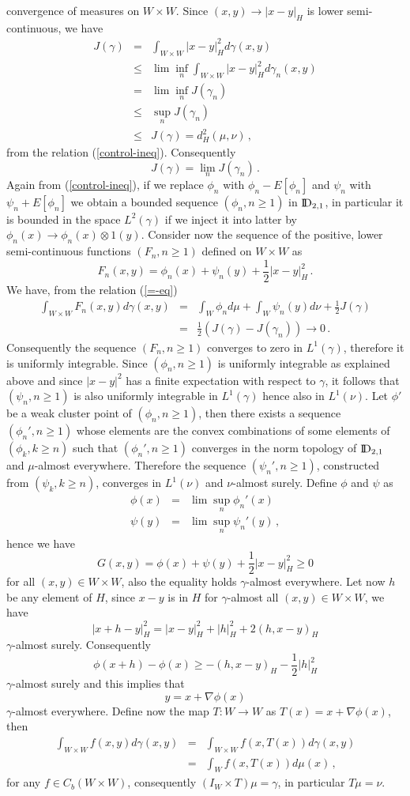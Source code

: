 \documentclass[12pt,a4paper]{book}
\newcommand{\be}{\begin{equation}}
\newcommand{\ee}{\end{equation}}
\newcommand{\beaa}{\begin{eqnarray*}}
\newcommand{\eeaa}{\end{eqnarray*}}
\newcommand{\DD}{{\rm I\!D}}
\newcommand{\ga}{\gamma}
\begin{document}
convergence of 
measures on $W\times W$. Since $(x,y)\to |x-y|_H$ is lower
semi-continuous, we have 
\beaa
J(\ga)&=&\int_{W\times W}|x-y|_H^2d\ga(x,y)\\
&\leq&\lim\inf_n\int_{W\times W}|x-y|_H^2d\ga_n(x,y)\\
&=&\lim\inf_nJ(\ga_n)\\
&\leq&\sup_nJ(\ga_n)\\
&\leq& J(\ga)=d_H^2(\mu,\nu)\,,
\eeaa
from the relation (\ref{control-ineq}). Consequently 
\be
\label{lim-eq}
J(\ga)=\lim_nJ(\ga_n)\,.
\ee
Again from (\ref{control-ineq}), if we replace $\phi_n$ with $\phi_n-E[\phi_n]$
and $\psi_n$ with $\psi_n+E[\phi_n]$ we obtain a bounded sequence
$(\phi_n,n\geq 1)$ in $\DD_{2,1}$, in particular it is bounded in the
space $L^2(\ga)$ if we inject it into  latter  by $\phi_n(x)\to
\phi_n(x)\otimes 1(y)$. Consider now the sequence of the 
positive, lower semi-continuous functions $(F_n,n\geq 1)$ defined on
$W\times W$ as   
$$
F_n(x,y)=\phi_n(x)+\psi_n(y)+\frac{1}{2}|x-y|_H^2\,.
$$
We have, from the relation (\ref{=-eq})
\beaa
\int_{W\times
  W}F_n(x,y)d\ga(x,y)&=&\int_W\phi_nd\mu+\int_W\psi_n(y)d\nu+\frac{1}{2}J(\ga)
\\ 
&=&\frac{1}{2}\left(J(\ga)-J(\ga_n)\right)\to 0\,.
\eeaa
Consequently the sequence $(F_n,n\geq 1)$ converges to zero in
$L^1(\ga)$, therefore it is uniformly integrable. Since $(\phi_n,n\geq
1)$ is uniformly integrable as explained above and since $|x-y|^2$ has
a finite expectation with respect to $\ga$, it follows that
$(\psi_n,n\geq 1)$ is also uniformly integrable in $L^1(\ga)$ hence
also in $L^1(\nu)$. Let $\phi'$ be a weak cluster point of
$(\phi_n,n\geq 1)$, then there exists a sequence $(\phi_n',n\geq 1)$
whose elements are the convex combinations of some  elements of
$(\phi_k,k\geq n)$ such that $(\phi_n',n\geq 1)$ converges in the norm
topology of $\DD_{2,1}$ and $\mu$-almost everywhere. Therefore the
 sequence $(\psi_n',n\geq 1)$, constructed from $(\psi_k,k\geq n)$,
 converges in $L^1(\nu)$ and $\nu$-almost surely. Define $\phi$ and
 $\psi$ as  
\beaa
\phi(x)&=&\lim\sup_n\phi_n'(x)\\
\psi(y)&=&\lim\sup_n\psi_n'(y)\,,
\eeaa
hence we have 
$$
G(x,y)=\phi(x)+\psi(y)+\frac{1}{2}|x-y|_H^2\geq 0
$$
for all $(x,y)\in W\times W$, also the  equality holds $\ga$-almost
everywhere. Let now $h$ be any element of $H$, since $x-y$ is in $H$
for $\ga$-almost all $(x,y)\in W\times W$, we have 
$$
|x+h-y|_H^2=|x-y|_H^2+|h|_H^2+2(h,x-y)_H
$$
$\ga$-almost surely. Consequently 
$$
\phi(x+h)-\phi(x)\geq -(h,x-y)_H-\frac{1}{2}|h|_H^2
$$
$\ga$-almost surely and  this implies that 
$$
y=x+\nabla \phi(x)
$$
$\ga$-almost everywhere. Define now the map $T:W\to W$ as
$T(x)=x+\nabla\phi(x)$, then 
\beaa
\int_{W\times W}f(x,y)d\ga(x,y)&=&\int_{W\times W}f(x,T(x))d\ga(x,y)\\
&=&\int_{W}f(x,T(x))d\mu(x)\,,
\eeaa
for any $f\in C_b(W\times W)$, consequently $(I_W\times T)\mu=\ga$, in
particular $T\mu=\nu$.
\end{document}
